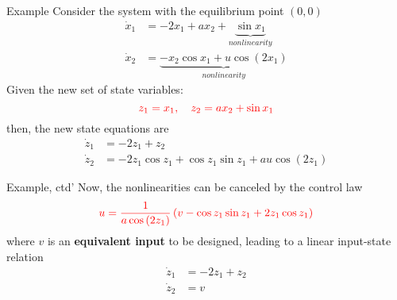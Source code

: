 \documentclass{beamer}
\begin{document}
  \begin{frame}{Example}
  Consider the system with the equilibrium point $(0, 0)$
  \begin{equation}\label{input-state-example}
  \begin{aligned}
    \dot{x}_{1} &= -2x_{1}+ax_{2}+\underbrace{\sin x_{1}}_{nonlinearity} \\
    \dot{x}_{2} &= \underbrace{-x_{2}\cos x_{1} + u \cos(2x_{1})}_{nonlinearity}
  \end{aligned}
  \end{equation}
  Given the new set of state variables:
  $$ {\color{red} z_{1}=x_{1} , \quad z_{2}=ax_{2} + \sin x_{1}} $$
  then, the new state equations are
    \begin{equation}\label{new-state}
      \begin{aligned}
        \dot{z}_{1} &= -2 z_{1}+z_{2} \\
        \dot{z}_{2} &= -2 z_{1} \cos z_{1}+\cos z_{1} \sin z_{1}+a u \cos \left(2 z_{1}\right)
      \end{aligned}
    \end{equation}
  \end{frame}


  \begin{frame}{Example, ctd'}
  Now, the nonlinearities can be canceled by the control law
  $$
    {\color{red}u=\frac{1}{a \cos \left(2 z_{1}\right)}\left(v-\cos z_{1} \sin z_{1}+2 z_{1} \cos z_{1}\right)}
  $$
  where $v$ is an \textbf{equivalent input} to be designed, leading to a linear input-state relation
  \begin{equation}\label{input-state-relation}
    \begin{aligned}
      \dot{z}_{1} &= -2z_{1} + z_{2} \\
      \dot{z}_{2} &= v
    \end{aligned}
  \end{equation}
  \vspace{-10pt}
\begin{figure}
  \centering
    \end{figure}
  \end{frame}
\end{document}
